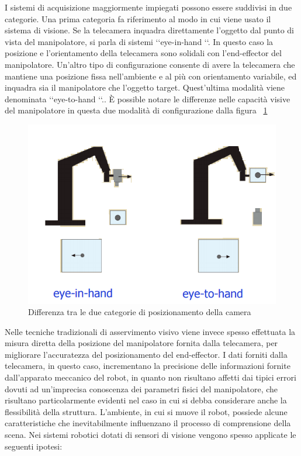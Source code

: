 I sistemi di acquisizione maggiormente impiegati possono essere suddivisi in due categorie. Una prima categoria fa riferimento al modo in cui viene usato il sistema di visione. Se la telecamera inquadra direttamente l’oggetto dal punto di vista del manipolatore, si parla di sistemi \lq \lq eye-in-hand \lq \lq. In questo caso la posizione
e l’orientamento della telecamera sono solidali con l’end-effector del manipolatore.
Un’altro tipo di configurazione consente di avere la telecamera che mantiene una posizione fissa nell’ambiente e al più con orientamento variabile, ed inquadra sia il manipolatore che l’oggetto target. Quest’ultima modalità
viene denominata \lq \lq eye-to-hand \lq \lq.. È possible notare le differenze nelle capacità visive del manipolatore in questa due modalità di configurazione dalla figura ~\ref{fig:eye_in_hand}
\begin{figure}[H]
   \centering
   \includegraphics[width=.7\columnwidth]{eyetoinhand.png}
   \caption{Differenza tra le due categorie di posizionamento della camera}
   \label{fig:eye_in_hand} 
\end{figure}
Nelle tecniche tradizionali di asservimento visivo viene invece spesso effettuata la misura diretta della posizione del manipolatore fornita dalla telecamera, per migliorare l’accuratezza del posizionamento del end-effector. I dati forniti dalla telecamera, in questo caso, incrementano la precisione delle informazioni fornite dall’apparato meccanico del robot, in quanto non risultano affetti dai tipici errori dovuti ad un’imprecisa conoscenza dei parametri fisici del manipolatore, che risultano particolarmente evidenti nel caso in cui si debba considerare anche la flessibilità della struttura.
L’ambiente, in cui si muove il robot, possiede alcune caratteristiche che inevitabilmente influenzano il processo di comprensione della scena. Nei sistemi robotici dotati di sensori di visione vengono spesso applicate le seguenti ipotesi:
